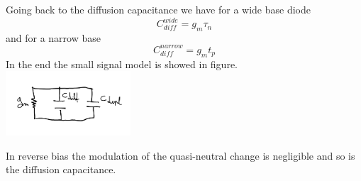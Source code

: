 Going back to the diffusion capacitance we have for a wide base diode
\begin{equation}
C_{diff}^{wide}=g_m\tau_n
\end{equation} 
and for a narrow base
\begin{equation}
C_{diff}^{narrow}=g_mt_p
\end{equation}
In the end the small signal model is showed in figure.\\

\centering
\includegraphics[width=0.35\textwidth]{smallpn.png}\\
\raggedright

In reverse bias the modulation of the quasi-neutral change is negligible and so is the diffusion capacitance.

